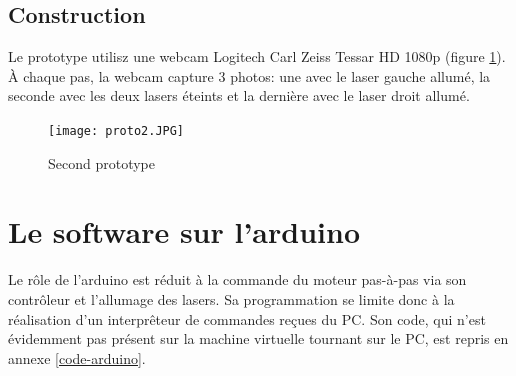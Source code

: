 \documentclass[a4paper,10pt]{report}
\begin{document}
\subsection{Construction}

Le prototype utilisz une webcam Logitech Carl Zeiss Tessar HD 1080p (figure \ref{proto}). À chaque pas, la webcam capture 3 photos: une avec le laser gauche allumé, la seconde avec les deux lasers éteints et la dernière avec le laser droit allumé.

\begin{figure}[h!]
\centering
\texttt{[image: proto2.JPG]}
\caption{Second prototype}
\label{proto}
\end{figure}

\section{Le software sur l'arduino}
Le rôle de l'arduino est réduit à la commande du moteur pas-à-pas via son contrôleur et l'allumage des lasers. Sa programmation se limite donc à la réalisation d'un interprêteur de commandes reçues du PC. Son code, qui n'est évidemment pas présent sur la machine virtuelle tournant sur le PC, est repris en annexe \ref{code-arduino}.
\end{document}

